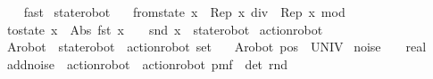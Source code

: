 \begin{isabellebody}
\ \ \isamarkupfalse%
\ fast%
\endisatagproof
{\isafoldproof}%
%
\isadelimproof
\isanewline
%
\endisadelimproof
\isanewline
\isanewline
{}\isamarkupfalse%
\ state{\isacharunderscore}{\kern0pt}robot\ {\isacharequal}{\kern0pt}\ {\isachardoublequoteopen}{}{}{\isachardoublequoteclose}\isanewline
\isanewline
{}\isamarkupfalse%
\ {\isachardoublequoteopen}from{\isacharunderscore}{\kern0pt}state\ x\ {\isacharequal}{\kern0pt}\ {\isacharparenleft}{\kern0pt}Rep\ x\ div\ {}{\isacharcomma}{\kern0pt}\ Rep\ x\ mod\ {}{\isacharparenright}{\kern0pt}{\isachardoublequoteclose}\isanewline
{}\isamarkupfalse%
\ {\isachardoublequoteopen}to{\isacharunderscore}{\kern0pt}state\ x\ {\isacharequal}{\kern0pt}\ {\isacharparenleft}{\kern0pt}Abs\ {\isacharparenleft}{\kern0pt}fst\ x\ {\isacharasterisk}{\kern0pt}\ {}\ {\isacharplus}{\kern0pt}\ snd\ x{\isacharparenright}{\kern0pt}\ {\isacharcolon}{\kern0pt}{\isacharcolon}{\kern0pt}\ state{\isacharunderscore}{\kern0pt}robot{\isacharparenright}{\kern0pt}{\isachardoublequoteclose}\isanewline
\isanewline
\isanewline
{}\isamarkupfalse%
\ action{\isacharunderscore}{\kern0pt}robot\ {\isacharequal}{\kern0pt}\ {}\isanewline
\isanewline
{}\isamarkupfalse%
\ A{\isacharunderscore}{\kern0pt}robot\ {\isacharcolon}{\kern0pt}{\isacharcolon}{\kern0pt}\ {\isachardoublequoteopen}state{\isacharunderscore}{\kern0pt}robot\ {\isasymRightarrow}\ action{\isacharunderscore}{\kern0pt}robot\ set{\isachardoublequoteclose}\ \isanewline
\ \ {\isachardoublequoteopen}A{\isacharunderscore}{\kern0pt}robot\ pos\ {\isacharequal}{\kern0pt}\ UNIV{\isachardoublequoteclose}\isanewline
\isanewline
{}\isamarkupfalse%
\ {\isachardoublequoteopen}noise\ {\isasymequiv}\ {\isacharparenleft}{\kern0pt}{}{\isachardot}{\kern0pt}{}\ {\isacharcolon}{\kern0pt}{\isacharcolon}{\kern0pt}\ real{\isacharparenright}{\kern0pt}{\isachardoublequoteclose}\isanewline
\isanewline
{}\isamarkupfalse%
\ add{\isacharunderscore}{\kern0pt}noise\ {\isacharcolon}{\kern0pt}{\isacharcolon}{\kern0pt}\ {\isachardoublequoteopen}action{\isacharunderscore}{\kern0pt}robot\ {\isasymRightarrow}\ action{\isacharunderscore}{\kern0pt}robot\ pmf{\isachardoublequoteclose}\ \ {\isachardoublequoteopen}{\isasymlambda}det\ rnd{\isachardot}{\kern0pt}\ {\isacharparenleft}{\kern0pt}\isanewline

\end{isabellebody}
